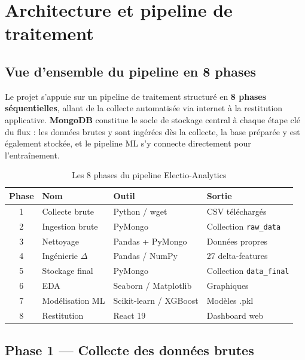 \chapter{Architecture et pipeline de traitement}
\label{ch:pipeline}

\section{Vue d'ensemble du pipeline en 8 phases}

Le projet s'appuie sur un pipeline de traitement structuré en \textbf{8 phases séquentielles},
allant de la collecte automatisée via internet à la restitution applicative.
\textbf{MongoDB} constitue le socle de stockage central à chaque étape clé du flux :
les données brutes y sont ingérées dès la collecte, la base préparée y est également
stockée, et le pipeline ML s'y connecte directement pour l'entraînement.

\begin{table}[H]
\centering
\caption{Les 8 phases du pipeline Electio-Analytics}
\label{tab:pipeline}
\begin{tabular}{clll}
\toprule
\textbf{Phase} & \textbf{Nom} & \textbf{Outil} & \textbf{Sortie} \\
\midrule
1 & Collecte brute       & Python / wget         & CSV téléchargés \\
2 & Ingestion brute      & PyMongo               & Collection \texttt{raw\_data} \\
3 & Nettoyage            & Pandas + PyMongo      & Données propres \\
4 & Ingénierie $\Delta$  & Pandas / NumPy        & 27 delta-features \\
5 & Stockage final       & PyMongo               & Collection \texttt{data\_final} \\
6 & EDA                  & Seaborn / Matplotlib  & Graphiques \\
7 & Modélisation ML      & Scikit-learn / XGBoost & Modèles .pkl \\
8 & Restitution          & React 19              & Dashboard web \\
\bottomrule
\end{tabular}
\end{table}

\section{Phase 1 --- Collecte des données brutes}

